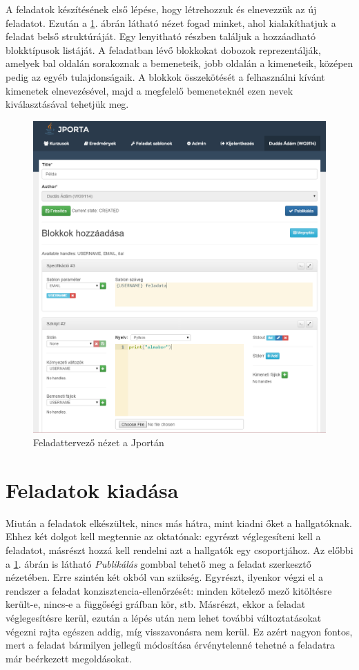 A feladatok készítésének első lépése, hogy létrehozzuk és elnevezzük az új feladatot.
Ezután a \ref{figure:jporta-exercise}. ábrán látható nézet fogad minket, ahol kialakíthatjuk a feladat belső struktúráját.
Egy lenyitható részben találjuk a hozzáadható blokktípusok listáját.
A feladatban lévő blokkokat dobozok reprezentálják, amelyek bal oldalán sorakoznak a bemeneteik, jobb oldalán a kimeneteik, középen pedig az egyéb tulajdonságaik.
A blokkok összekötését a felhasználni kívánt kimenetek elnevezésével, majd a megfelelő bemeneteknél ezen nevek kiválasztásával tehetjük meg.

\begin{figure}[h]
    \centering
    \includegraphics[width=\textwidth]{figures/jporta-exercise}
    \caption{Feladattervező nézet a Jportán}
    \label{figure:jporta-exercise}
\end{figure}

\section{Feladatok kiadása}
Miután a feladatok elkészültek, nincs más hátra, mint kiadni őket a hallgatóknak.
Ehhez két dolgot kell megtennie az oktatónak: egyrészt véglegesíteni kell a feladatot, másrészt hozzá kell rendelni azt a hallgatók egy csoportjához.
Az előbbi a \ref{figure:jporta-exercise}. ábrán is látható \textit{Publikálás} gombbal tehető meg a feladat szerkesztő nézetében.
Erre szintén két okból van szükség.
Egyrészt, ilyenkor végzi el a rendszer a feladat konzisztencia-ellenőrzését: minden kötelező mező kitöltésre került-e, nincs-e a függőségi gráfban kör, stb.
Másrészt, ekkor a feladat véglegesítésre kerül, ezután a lépés után nem lehet további változtatásokat végezni rajta egészen addig, míg visszavonásra nem kerül.
Ez azért nagyon fontos, mert a feladat bármilyen jellegű módosítása érvénytelenné tehetné a feladatra már beérkezett megoldásokat.

